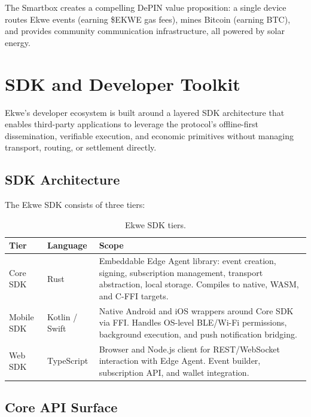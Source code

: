 \documentclass[11pt,a4paper]{article}
\begin{document}
The Smartbox creates a compelling DePIN value proposition: a single device routes Ekwe events (earning \$EKWE gas fees), mines Bitcoin (earning BTC), and provides community communication infrastructure, all powered by solar energy.

\section{SDK and Developer Toolkit}
\label{sec:sdk}

Ekwe's developer ecosystem is built around a layered SDK architecture that enables third-party applications to leverage the protocol's offline-first dissemination, verifiable execution, and economic primitives without managing transport, routing, or settlement directly.

\subsection{SDK Architecture}

The Ekwe SDK consists of three tiers:

\begin{table}[H]
\centering
\caption{Ekwe SDK tiers.}
\label{tab:sdk}
\begin{tabular}{@{}llp{7cm}@{}}
\toprule
\textbf{Tier} & \textbf{Language} & \textbf{Scope} \\
\midrule
Core SDK & Rust & Embeddable Edge Agent library: event creation, signing, subscription management, transport abstraction, local storage. Compiles to native, WASM, and C-FFI targets. \\
Mobile SDK & Kotlin / Swift & Native Android and iOS wrappers around Core SDK via FFI. Handles OS-level BLE/Wi-Fi permissions, background execution, and push notification bridging. \\
Web SDK & TypeScript & Browser and Node.js client for REST/WebSocket interaction with Edge Agent. Event builder, subscription API, and wallet integration. \\
\bottomrule
\end{tabular}
\end{table}

\subsection{Core API Surface}
\end{document}
